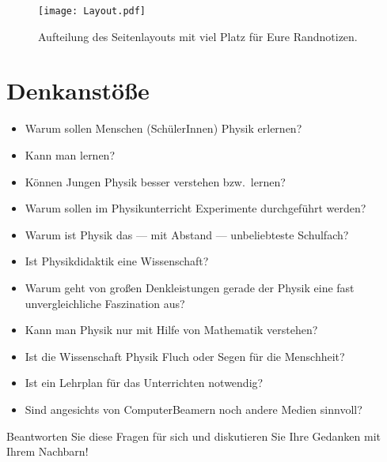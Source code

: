 \documentclass[11pt,a4paper]{book}
\begin{document}
\vs{1cm}
\begin{figure}[h]
	\centering
	\texttt{[image: Layout.pdf]}
	\caption{Aufteilung des Seitenlayouts mit viel Platz f\"{u}r Eure Randnotizen.}
	\label{fig:Seitenlayout}
\end{figure}


\tableofcontents
\newpage

\restoregeometry %

\chapter{Denkanstöße}\label{Denk}

\begin{itemize}
\item
Warum sollen Menschen (Sch\"{u}lerInnen) Physik erlernen?
\item
Kann man  lernen?
\item
K\"{o}nnen Jungen Physik besser verstehen bzw.\ lernen?
\item
Warum sollen im Physikunterricht Experimente durchgef\"{u}hrt werden?
\item
Warum ist Physik das --- mit Abstand --- unbeliebteste Schulfach?
\item
Ist Physikdidaktik eine Wissenschaft?
\item
Warum geht von gro{\ss}en Denkleistungen gerade der Physik eine fast unvergleichliche Faszination aus?
\item
Kann man Physik nur mit Hilfe von Mathematik verstehen?
\item
Ist die Wissenschaft Physik Fluch oder Segen f\"{u}r die Menschheit?
\item
Ist ein Lehrplan f\"{u}r das Unterrichten notwendig?
\item
Sind angesichts von ComputerBeamern noch andere Medien sinnvoll?
\end{itemize}



\begin{uea}
	Beantworten Sie diese Fragen für sich und diskutieren Sie Ihre Gedanken mit Ihrem Nachbarn!
\end{uea}

\newpage

\end{document}
